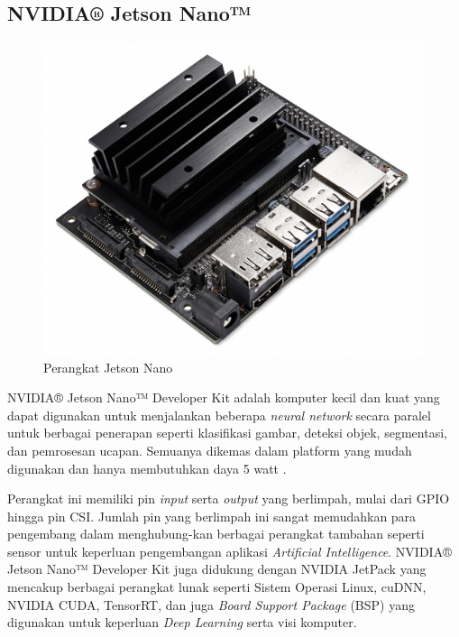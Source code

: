 \subsection{NVIDIA® Jetson Nano™}

\begin{figure} [ht] \centering
    \includegraphics[scale=0.25]{gambar/JetsonNano.jpg}
    \caption{Perangkat Jetson Nano}
    \label{fig:Perangkat Jetson Nano}
\end{figure}

NVIDIA® Jetson Nano™ Developer Kit adalah komputer kecil dan kuat yang dapat digunakan untuk menjalankan beberapa \emph{neural network} secara paralel untuk berbagai penerapan seperti klasifikasi gambar, deteksi objek, segmentasi, dan pemrosesan ucapan. Semuanya dikemas dalam platform yang mudah digunakan dan hanya membutuhkan daya 5 watt \parencite{Developer_2023}.

Perangkat ini memiliki pin \emph{input} serta \emph{output} yang berlimpah, mulai dari GPIO hingga pin CSI. Jumlah pin yang berlimpah ini sangat memudahkan para pengembang dalam menghubung-kan berbagai perangkat tambahan seperti sensor untuk keperluan pengembangan aplikasi \emph{Artificial Intelligence}. NVIDIA® Jetson Nano™ Developer Kit juga didukung dengan NVIDIA JetPack yang mencakup berbagai perangkat lunak seperti Sistem Operasi Linux, cuDNN, NVIDIA CUDA, TensorRT, dan juga \emph{Board Support Package} (BSP) yang digunakan untuk keperluan \emph{Deep Learning} serta visi komputer.

